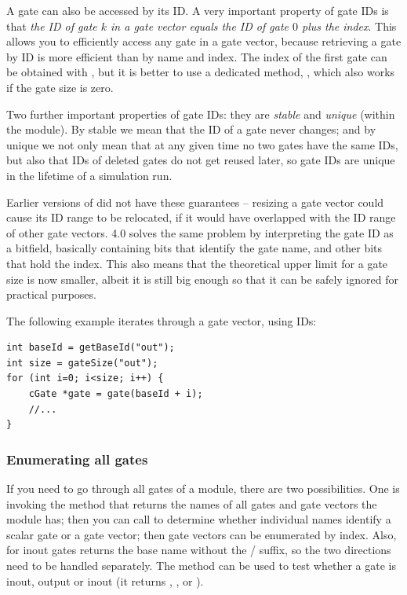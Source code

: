 A gate can also be accessed by its ID. A very important property of gate IDs
is that \textit{the ID of gate $k$ in a gate vector equals the ID of gate $0$ plus the index}.
This allows you to efficiently access any gate in a gate vector, because
retrieving a gate by ID is more efficient than by name and index.
The index of the first gate can be obtained with ,
but it is better to use a dedicated method, ,
which also works if the gate size is zero.

Two further important properties of gate IDs: they are \textit{stable}
and \textit{unique} (within the module). By stable we mean that the ID
of a gate never changes; and by unique we not only mean that at any
given time no two gates have the same IDs, but also that IDs of deleted
gates do not get reused later, so gate IDs are unique in the lifetime
of a simulation run.

\begin{note}
    Earlier versions of {\opp} did not have these guarantees -- resizing
    a gate vector could cause its ID range to be relocated, if it
    would have overlapped with the ID range of other gate vectors.
    {\opp} 4.0 solves the same problem by interpreting the gate ID
    as a bitfield, basically containing bits that identify the gate name,
    and other bits that hold the index. This also means that the theoretical
    upper limit for a gate size is now smaller, albeit it is still
    big enough so that it can be safely ignored for practical purposes.
\end{note}

The following example iterates through a gate vector, using IDs:

\begin{verbatim}
int baseId = getBaseId("out");
int size = gateSize("out");
for (int i=0; i<size; i++) {
    cGate *gate = gate(baseId + i);
    //...
}
\end{verbatim}


\subsubsection{Enumerating all gates}

If you need to go through all gates of a module, there are
two possibilities. One is invoking the  method
that returns the names of all gates and gate vectors the module
has; then you can call  to determine
whether individual names identify a scalar gate or a gate vector;
then gate vectors can be enumerated by index. Also, for inout
gates  returns the base name without the
/ suffix, so the two directions
need to be handled separately. The  method
can be used to test whether a gate is inout, output or inout
(it returns , , or
).

